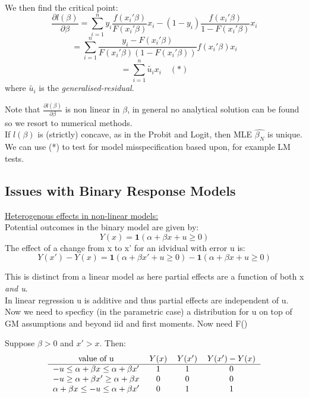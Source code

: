 \documentclass[DIV=14,titlepage=false]{scrreprt}
\begin{document}
We then find the critical point:
\[\frac{\partial l(\beta)}{\partial \beta}=\sum_{i=1}^n y_i\frac{f(x_i'\beta)}{F(x_i'\beta)}x_i-(1-y_i)\frac{f(x_i'\beta)}{1-F(x_i'\beta)}x_i\]
\[=\sum_{i=1}^n \frac{y_i-F(x_i'\beta)}{F(x_i'\beta)(1-F(x_i'\beta))}f(x_i'\beta)x_i\]
\[=\sum_{i=1}^n \tilde{u_i}x_i \quad (*)\]
where \(\tilde{u_i}\) is the \textit{generalised-residual}.

\begin{note}
    Note that \(\frac{\partial l(\beta)}{\partial \beta}\) is non linear in \(\beta\), in general no analytical solution can be found so we resort to numerical methods.\\
    If \(l(\beta)\) is (strictly) concave, as in the Probit and Logit, then MLE \(\hat{\beta_N}\) is unique.\\
    We can use (*) to test for model misspecification based upon, for example LM tests.
\end{note}

\subsection{Issues with Binary Response Models}

\underline{Heterogenous effects in non-linear models:}\\

Potential outcomes in the binary model are given by:
\[Y(x)=\textbf{1}(\alpha+\beta x + u \geq 0 )\]
The effect of a change from x to x' for an idvidual with error u is:
\[Y(x')-Y(x)=\textbf{1}(\alpha+\beta x' + u \geq 0 )-\textbf{1}(\alpha+\beta x + u \geq 0 )\]

\begin{note}
    This is distinct from a linear model as here partial effects are a function of both x \textit{and u}.\\
    In linear regression u is additive and thus partial effects are independent of u.\\
    Now we need to specficy (in the parametric case) a distribution for u on top of GM assumptions and beyond iid and first moments. Now need F()
\end{note}

Suppose \(\beta>0\) and \(x'>x\). Then:
\[
\begin{tabular}{c c c c}
\text{value of u} & \(Y(x)\) & \(Y(x')\) & \(Y(x')-Y(x)\)\\
\hline
\(-u\leq \alpha+\beta x \leq \alpha+\beta x'\) &  1 & 1 & 0\\
\(-u\geq \alpha+\beta x' \geq \alpha+\beta x \)&  0 & 0 & 0\\
\(\alpha+\beta x \leq -u \leq \alpha+\beta x' \)&  0 & 1 & 1
\end{tabular}
\]
\end{document}
